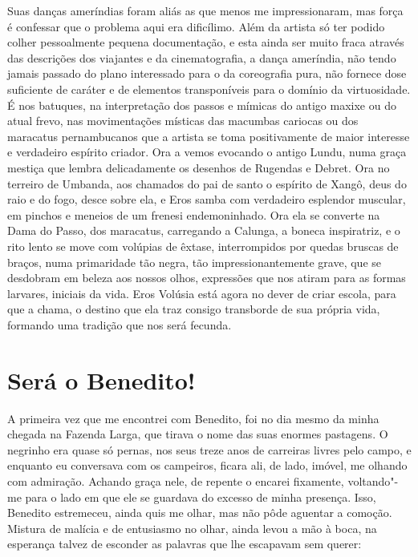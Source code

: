 Suas danças ameríndias foram aliás as que menos me impressionaram, mas
força é confessar que o problema aqui era dificílimo. Além da artista só
ter podido colher pessoalmente pequena documentação, e esta ainda ser
muito fraca através das descrições dos viajantes e da cinematografia, a
dança ameríndia, não tendo jamais passado do plano interessado para o da
coreografia pura, não fornece dose suficiente de caráter e de elementos
transponíveis para o domínio da virtuosidade. É nos batuques, na
interpretação dos passos e mímicas do antigo maxixe ou do atual frevo,
nas movimentações místicas das macumbas cariocas ou dos maracatus
pernambucanos que a artista se toma positivamente de maior interesse e
verdadeiro espírito criador. Ora a vemos evocando o antigo Lundu, numa
graça mestiça que lembra delicadamente os desenhos de Rugendas e Debret.
Ora no terreiro de Umbanda, aos chamados do pai de santo o espírito de
Xangô, deus do raio e do fogo, desce sobre ela, e Eros samba com
verdadeiro esplendor muscular, em pinchos e meneios de um frenesi
endemoninhado. Ora ela se converte na Dama do Passo, dos maracatus,
carregando a Calunga, a boneca inspiratriz, e o rito lento se move com
volúpias de êxtase, interrompidos por quedas bruscas de braços, numa
primaridade tão negra, tão impressionantemente grave, que se desdobram
em beleza aos nossos olhos, expressões que nos atiram para as formas
larvares, iniciais da vida. Eros Volúsia está agora no dever de criar
escola, para que a chama, o destino que ela traz consigo transborde de
sua própria vida, formando uma tradição que nos será fecunda.

\chapter{Será o Benedito!}

A primeira vez que me encontrei com Benedito, foi no dia mesmo da minha
chegada na Fazenda Larga, que tirava o nome das suas enormes pastagens.
O negrinho era quase só pernas, nos seus treze anos de carreiras livres
pelo campo, e enquanto eu conversava com os campeiros, ficara ali, de
lado, imóvel, me olhando com admiração. Achando graça nele, de repente o
encarei fixamente, voltando"-me para o lado em que ele se guardava do
excesso de minha presença. Isso, Benedito estremeceu, ainda quis me
olhar, mas não pôde aguentar a comoção. Mistura de malícia e de
entusiasmo no olhar, ainda levou a mão à boca, na esperança talvez de
esconder as palavras que lhe escapavam sem querer:

